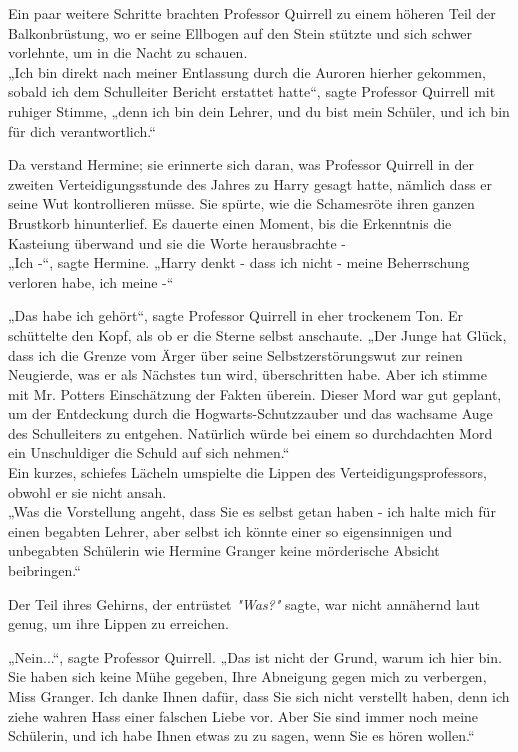 {Ein paar weitere Schritte brachten Professor Quirrell zu einem höheren Teil der Balkonbrüstung, wo er seine Ellbogen auf den Stein stützte und sich schwer vorlehnte, um in die Nacht zu schauen.\\ „Ich bin direkt nach meiner Entlassung durch die Auroren hierher gekommen, sobald ich dem Schulleiter Bericht erstattet hatte“, sagte Professor Quirrell mit ruhiger Stimme, „denn ich bin dein Lehrer, und du bist mein Schüler, und ich bin für dich verantwortlich.“

Da verstand Hermine; sie erinnerte sich daran, was Professor Quirrell in der zweiten Verteidigungsstunde des Jahres zu Harry gesagt hatte, nämlich dass er seine Wut kontrollieren müsse. Sie spürte, wie die Schamesröte ihren ganzen Brustkorb hinunterlief. Es dauerte einen Moment, bis die Erkenntnis die Kasteiung überwand und sie die Worte herausbrachte -\\ „Ich -“, sagte Hermine. „Harry denkt - dass ich nicht - meine Beherrschung verloren habe, ich meine -“

„Das habe ich gehört“, sagte Professor Quirrell in eher trockenem Ton. Er schüttelte den Kopf, als ob er die Sterne selbst anschaute. „Der Junge hat Glück, dass ich die Grenze vom Ärger über seine Selbstzerstörungswut zur reinen Neugierde, was er als Nächstes tun wird, überschritten habe. Aber ich stimme mit Mr. Potters Einschätzung der Fakten überein. Dieser Mord war gut geplant, um der Entdeckung durch die Hogwarts-Schutzzauber und das wachsame Auge des Schulleiters zu entgehen. Natürlich würde bei einem so durchdachten Mord ein Unschuldiger die Schuld auf sich nehmen.“\\ Ein kurzes, schiefes Lächeln umspielte die Lippen des Verteidigungsprofessors, obwohl er sie nicht ansah.\\ „Was die Vorstellung angeht, dass Sie es selbst getan haben - ich halte mich für einen begabten Lehrer, aber selbst ich könnte einer so eigensinnigen und unbegabten Schülerin wie Hermine Granger keine mörderische Absicht beibringen.“

Der Teil ihres Gehirns, der entrüstet \emph{"Was?"} sagte, war nicht annähernd laut genug, um ihre Lippen zu erreichen.

„Nein...“, sagte Professor Quirrell. „Das ist nicht der Grund, warum ich hier bin. Sie haben sich keine Mühe gegeben, Ihre Abneigung gegen mich zu verbergen, Miss Granger. Ich danke Ihnen dafür, dass Sie sich nicht verstellt haben, denn ich ziehe wahren Hass einer falschen Liebe vor. Aber Sie sind immer noch meine Schülerin, und ich habe Ihnen etwas zu zu sagen, wenn Sie es hören wollen.“

}
